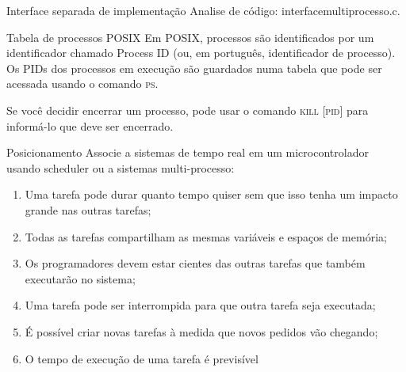 \documentclass{beamer}
\begin{document}
\begin{frame}[fragile]{Interface separada de implementação}
  \centering
  \Large
  Analise de código: interfacemultiprocesso.c.
\end{frame}

\begin{frame}[fragile]{Tabela de processos POSIX}
  \centering
  \Large
  Em POSIX, processos são identificados por um identificador chamado Process
  ID (ou, em português, identificador de processo). Os PIDs dos processos em
  execução são guardados numa tabela que pode ser acessada usando o comando
  \textsc{ps}.

  Se você decidir encerrar um processo, pode usar o comando \textsc{kill [pid]}
  para informá-lo que deve ser encerrado.
\end{frame}

\begin{frame}[fragile]{Posicionamento}
  \centering
  \large
  Associe a sistemas de tempo real em um microcontrolador usando scheduler
  ou a sistemas multi-processo:
  \begin{enumerate}
    \item Uma tarefa pode durar quanto tempo quiser sem que isso tenha um
      impacto grande nas outras tarefas;
    \item Todas as tarefas compartilham as mesmas variáveis e espaços de memória;
    \item Os programadores devem estar cientes das outras tarefas que também
      executarão no sistema;
    \item Uma tarefa pode ser interrompida para que outra tarefa seja executada;
    \item É possível criar novas tarefas à medida que novos pedidos vão
      chegando;
    \item O tempo de execução de uma tarefa é previsível
  \end{enumerate}
\end{frame}
\end{document}
